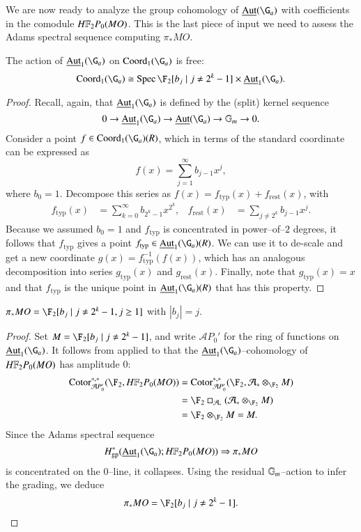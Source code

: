 We are now ready to analyze the group cohomology of $\InternalAut(\G_a)$ with coefficients in the comodule $\HFtwo P_0(MO)$.  This is the last piece of input we need to assess the Adams spectral sequence computing $\pi_* MO$.
\begin{theorem}\label{CalculationOfAutGaActionOnMO}
The action of $\InternalAut_1(\G_a)$ on $\Coord_1(\G_a)$ is free: \[\Coord_1(\G_a) \cong \Spec \F_2[b_j \mid j \ne 2^k - 1] \times \InternalAut_1(\G_a).\]
\end{theorem}
\begin{proof}
Recall, again, that $\InternalAut_1(\G_a)$ is defined by the (split) kernel sequence \[0 \to \InternalAut_1(\G_a) \to \InternalAut(\G_a) \to \Gm \to 0.\]  Consider a point $f \in \Coord_1(\G_a)(R)$, which in terms of the standard coordinate can be expressed as \[f(x) = \sum_{j=1}^\infty b_{j-1} x^j,\] where $b_0 = 1$.  Decompose this series as $f(x) = f_{\mathrm{typ}}(x) + f_{\mathrm{rest}}(x)$, with
\begin{align*}
f_{\mathrm{typ}}(x) & = \sum_{k=0}^\infty b_{2^k-1} x^{2^k}, &
f_{\mathrm{rest}}(x) & = \sum_{j \ne 2^k} b_{j-1} x^j.
\end{align*}
Because we assumed $b_0 = 1$ and $f_{\mathrm{typ}}$ is concentrated in power--of--$2$ degrees, it follows that $f_{\mathrm{typ}}$ gives a point $f_{\mathrm{typ}} \in \InternalAut_1(\G_a)(R)$.  We can use it to de-scale and get a new coordinate $g(x) = f_{\mathrm{typ}}^{-1}(f(x))$, which has an analogous decomposition into series $g_{\mathrm{typ}}(x)$ and $g_{\mathrm{rest}}(x)$.  Finally, note that $g_{\mathrm{typ}}(x) = x$ and that $f_{\mathrm{typ}}$ is the unique point in $\InternalAut_1(\G_a)(R)$ that has this property.
\end{proof}

\begin{corollary}\label{CalculationOfPiStarMO}
$\pi_* MO = \F_2[b_j \mid j \ne 2^k - 1, j \ge 1]$ with $|b_j| = j$.
\end{corollary}
\begin{proof}
Set $M = \F_2[b_j \mid j \ne 2^k - 1]$, and write $\mathcal AP_0'$ for the ring of functions on $\InternalAut_1(\G_a)$.  It follows from  applied to  that the $\InternalAut_1(\G_a)$--cohomology of $\HFtwo P_0(MO)$ has amplitude $0$:
\begin{align*}
\Cotor_{\mathcal AP_0'}^{*, *}(\F_2, \HFtwo P_0(MO)) & = \Cotor_{\mathcal AP_0'}^{*, *}(\F_2, \mathcal A_* \otimes_{\F_2} M) \\
& = \F_2 \cotensor_{\mathcal A_*} (\mathcal A_* \otimes_{\F_2} M) \\
& = \F_2 \otimes_{\F_2} M = M.
\end{align*}
Since the Adams spectral sequence \[H^*_{\mathrm{gp}}(\InternalAut_1(\G_a); \HFtwo P_0(MO)) \Rightarrow \pi_* MO\] is concentrated on the $0$--line, it collapses.  Using the residual $\mathbb G_m$--action to infer the grading, we deduce \[\pi_* MO = \F_2[b_j \mid j \ne 2^k-1]. \qedhere\]
\end{proof}

